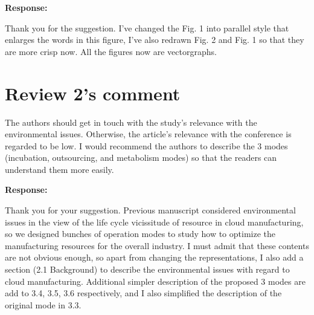 \documentclass{article}
\begin{document}
\textbf{Response:}

Thank you for the suggestion. I've changed the Fig. 1 into parallel style that enlarges the words in this figure, I've also redrawn Fig. 2 and Fig. 1 so that they are more crisp now. All the figures now are vectorgraphs.

\section*{Review 2's comment} %
The authors should get in touch with the study's relevance with the environmental issues. Otherwise, the article's relevance with the conference is regarded to be low.
I would recommend the authors to describe the 3 modes (incubation, outsourcing, and metabolism modes) so that the readers can understand them more easily.

\textbf{Response:}

Thank you for your suggestion. Previous manuscript considered environmental issues in the view of the life cycle vicissitude of resource in cloud manufacturing, so we designed bunches of operation modes to study how to optimize the manufacturing resources for the overall industry. I must admit that these contents are not obvious enough, so apart from changing the representations, I also add a section (2.1 Background) to describe the environmental issues with regard to cloud manufacturing. Additional simpler description of the proposed 3 modes are add to 3.4, 3.5, 3.6 respectively, and I also simplified the description of the original mode in 3.3.
\end{document}

